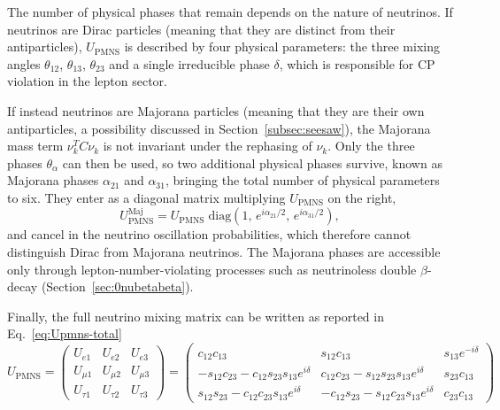 The number of physical phases that remain depends on the nature of neutrinos. If neutrinos are Dirac particles (meaning that they are distinct from their antiparticles), $U_\text{PMNS}$ is described by four physical parameters: the three mixing angles $\theta_{12}$, $\theta_{13}$, $\theta_{23}$ and a single irreducible phase $\delta$, which is responsible for \ac{CP} violation in the lepton sector.

If instead neutrinos are Majorana particles (meaning that they are their own antiparticles, a possibility discussed in Section~\ref{subsec:seesaw}), the Majorana mass term $\nu_k^T C \nu_k$ is not invariant under the rephasing of $\nu_k$. Only the three phases $\theta_\alpha$ can then be used, so two additional physical phases survive, known as Majorana phases $\alpha_{21}$ and $\alpha_{31}$, bringing the total number of physical parameters to six. They enter as a diagonal matrix multiplying $U_\text{PMNS}$ on the right,
\begin{equation}
    \label{eq:Upmns-majorana}
    U_\text{PMNS}^\text{Maj} = U_\text{PMNS}\;\text{diag}\left(1,\, e^{i\alpha_{21}/2},\, e^{i\alpha_{31}/2}\right),
\end{equation}
and cancel in the neutrino oscillation probabilities, which therefore cannot distinguish Dirac from Majorana neutrinos. The Majorana phases are accessible only through lepton-number-violating processes such as neutrinoless double $\beta$-decay (Section~\ref{sec:0nubetabeta}).

Finally, the full neutrino mixing matrix can be written as reported in Eq.~\ref{eq:Upmns-total}
\begin{equation}
    \label{eq:Upmns-total}
    U_{\text{PMNS}} = 
    \begin{pmatrix}
    U_{e1} & U_{e2} & U_{e3} \\
    U_{\mu 1} & U_{\mu 2} & U_{\mu 3} \\
    U_{\tau 1} & U_{\tau 2} & U_{\tau 3}
    \end{pmatrix}
    =
    \begin{pmatrix}
    c_{12}c_{13} & s_{12}c_{13} & s_{13}e^{-i\delta} \\[1ex]
    -s_{12}c_{23} - c_{12}s_{23}s_{13}e^{i\delta} & c_{12}c_{23} - s_{12}s_{23}s_{13}e^{i\delta} & s_{23}c_{13} \\[1ex]
    s_{12}s_{23} - c_{12}c_{23}s_{13}e^{i\delta} & -c_{12}s_{23} - s_{12}c_{23}s_{13}e^{i\delta} & c_{23}c_{13}
    \end{pmatrix}
\end{equation}

